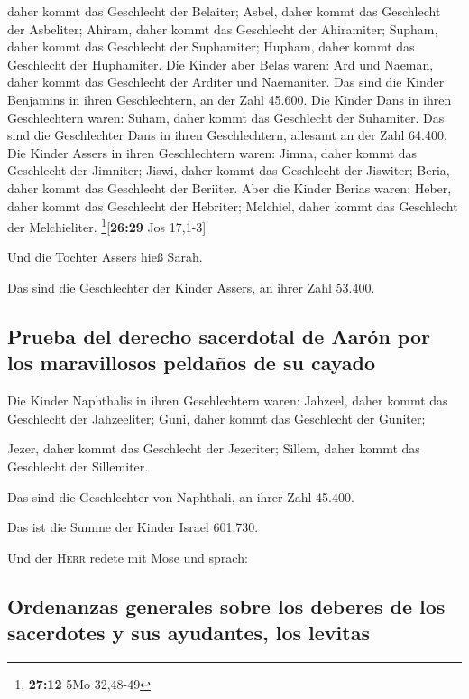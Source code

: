 daher kommt das Geschlecht der Belaiter; Asbel, daher kommt das
Geschlecht der Asbeliter; Ahiram, daher kommt das Geschlecht der
Ahiramiter;  Supham, daher kommt das Geschlecht der
Suphamiter; Hupham, daher kommt das Geschlecht der Huphamiter.
 Die Kinder aber Belas waren: Ard und Naeman, daher kommt
das Geschlecht der Arditer und Naemaniter.  Das sind die
Kinder Benjamins in ihren Geschlechtern, an der Zahl 45.600.
 Die Kinder Dans in ihren Geschlechtern waren: Suham,
daher kommt das Geschlecht der Suhamiter.  Das sind die
Geschlechter Dans in ihren Geschlechtern, allesamt an der Zahl 64.400.
 Die Kinder Assers in ihren Geschlechtern waren: Jimna,
daher kommt das Geschlecht der Jimniter; Jiswi, daher kommt das
Geschlecht der Jiswiter; Beria, daher kommt das Geschlecht der Beriiter.
 Aber die Kinder Berias waren: Heber, daher kommt das
Geschlecht der Hebriter; Melchiel, daher kommt das Geschlecht der
Melchieliter. \footnote{\textbf{27:12} 5Mo 32,48-49}{[}\textbf{26:29}
Jos 17,1-3{]}

 Und die Tochter Assers hieß Sarah.

 Das sind die Geschlechter der Kinder Assers, an ihrer
Zahl 53.400.

\hypertarget{prueba-del-derecho-sacerdotal-de-aaruxf3n-por-los-maravillosos-peldauxf1os-de-su-cayado}{%
\subsection{Prueba del derecho sacerdotal de Aarón por los maravillosos
peldaños de su
cayado}\label{prueba-del-derecho-sacerdotal-de-aaruxf3n-por-los-maravillosos-peldauxf1os-de-su-cayado}}

 Die Kinder Naphthalis in ihren Geschlechtern waren:
Jahzeel, daher kommt das Geschlecht der Jahzeeliter; Guni, daher kommt
das Geschlecht der Guniter;

 Jezer, daher kommt das Geschlecht der Jezeriter; Sillem,
daher kommt das Geschlecht der Sillemiter.

 Das sind die Geschlechter von Naphthali, an ihrer Zahl
45.400.

 Das ist die Summe der Kinder Israel 601.730.

 Und der \textsc{Herr} redete mit Mose und sprach:

\hypertarget{ordenanzas-generales-sobre-los-deberes-de-los-sacerdotes-y-sus-ayudantes-los-levitas}{%
\subsection{Ordenanzas generales sobre los deberes de los sacerdotes y
sus ayudantes, los
levitas}\label{ordenanzas-generales-sobre-los-deberes-de-los-sacerdotes-y-sus-ayudantes-los-levitas}}

